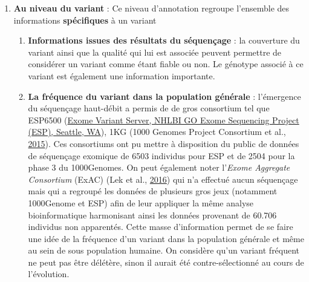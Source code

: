 \documentclass[12pt,twoside]{reedthesis}
\providecommand{\tightlist}{%
  \setlength{\itemsep}{0pt}\setlength{\parskip}{0pt}}
\theoremstyle{definition}
\theoremstyle{definition}
\theoremstyle{remark}
\begin{document}
  \begin{enumerate}
  \def\labelenumi{\arabic{enumi}.}
  \tightlist
  \item
    \textbf{Au niveau du variant} : Ce niveau d'annotation regroupe
    l'ensemble des informations \textbf{spécifiques} à un variant
  
    \begin{enumerate}
    \def\labelenumii{\alph{enumii}.}
    \tightlist
    \item
      \textbf{Informations issues des résultats du séquençage} : la
      couverture du variant ainsi que la qualité qui lui est associée
      peuvent permettre de considérer un variant comme étant fiable ou
      non. Le génotype associé à ce variant est également une information
      importante.\\
    \item
      \textbf{La fréquence du variant dans la population générale} :
      l'émergence du séquençage haut-débit a permis de de gros consortium
      tel que ESP6500 (\href{http://evs.gs.washington.edu/EVS/}{Exome
      Variant Server, NHLBI GO Exome Sequencing Project (ESP), Seattle,
      WA}), 1KG (1000 Genomes Project Consortium et al.,
      \protect\hyperlink{ref-1000GenomesProjectConsortium2015}{2015}). Ces
      consortiums ont pu mettre à disposition du public de données de
      séquençage exomique de 6503 individus pour ESP et de 2504 pour la
      phase 3 du 1000Genomes. On peut également noter l'\emph{Exome
      Aggregate Consortium} (ExAC) (Lek et al.,
      \protect\hyperlink{ref-Lek2016}{2016}) qui n'a effectué aucun
      séquençage mais qui a regroupé les données de plusieurs gros jeux
      (notamment 1000Genome et ESP) afin de leur appliquer la même analyse
      bioinformatique harmonisant ainsi les données provenant de 60.706
      individus non apparentés. Cette masse d'information permet de se
      faire une idée de la fréquence d'un variant dans la population
      générale et même au sein de sous population humaine. On considère
      qu'un variant fréquent ne peut pas être délétère, sinon il aurait
      été contre-sélectionné au cours de l'évolution.
    \end{enumerate}
  \end{enumerate}
  
  \newpage
  
\end{document}
